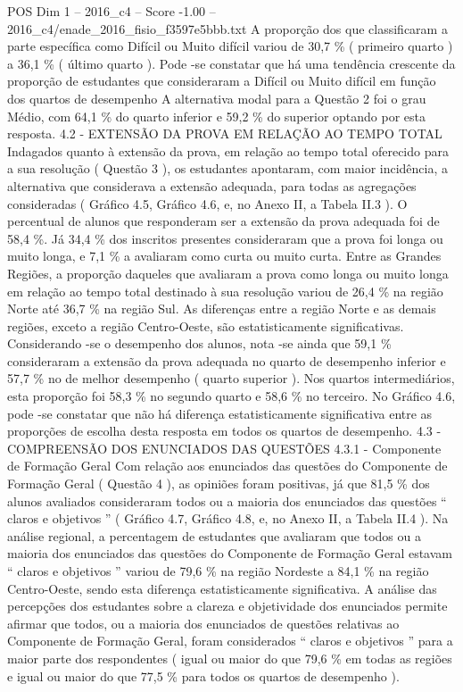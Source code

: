 \begin{textsample}{POS Dim 1 – 2016\_c4 – Score -1.00 – 2016\_c4/enade\_2016\_fisio\_f3597e5bbb.txt}
A proporção dos que classificaram a parte específica como Difícil ou Muito difícil variou de 30,7 \% ( primeiro quarto ) a 36,1 \% ( último quarto ).
Pode -se constatar que há uma tendência crescente da proporção de estudantes que consideraram a Difícil ou Muito difícil em função dos quartos de desempenho A alternativa modal para a Questão 2 foi o grau Médio, com 64,1 \% do quarto inferior e 59,2 \% do superior optando por esta resposta. 4.2 - EXTENSÃO DA PROVA EM RELAÇÃO AO TEMPO TOTAL Indagados quanto à extensão da prova, em relação ao tempo total oferecido para a sua resolução ( Questão 3 ), os estudantes apontaram, com maior incidência, a alternativa que considerava a extensão adequada, para todas as agregações consideradas ( Gráfico 4.5, Gráfico 4.6, e, no Anexo II, a Tabela II.3 ).
O percentual de alunos que responderam ser a extensão da prova adequada foi de 58,4 \%.
Já 34,4 \% dos inscritos presentes consideraram que a prova foi longa ou muito longa, e 7,1 \% a avaliaram como curta ou muito curta.
Entre as Grandes Regiões, a proporção daqueles que avaliaram a prova como longa ou muito longa em relação ao tempo total destinado à sua resolução variou de 26,4 \% na região Norte até 36,7 \% na região Sul.
As diferenças entre a região Norte e as demais regiões, exceto a região Centro-Oeste, são estatisticamente significativas.
Considerando -se o desempenho dos alunos, nota -se ainda que 59,1 \% consideraram a extensão da prova adequada no quarto de desempenho inferior e 57,7 \% no de melhor desempenho ( quarto superior ).
Nos quartos intermediários, esta proporção foi 58,3 \% no segundo quarto e 58,6 \% no terceiro.
No Gráfico 4.6, pode -se constatar que não há diferença estatisticamente significativa entre as proporções de escolha desta resposta em todos os quartos de desempenho. 4.3 - COMPREENSÃO DOS ENUNCIADOS DAS QUESTÕES 4.3.1 - Componente de Formação Geral Com relação aos enunciados das questões do Componente de Formação Geral ( Questão 4 ), as opiniões foram positivas, já que 81,5 \% dos alunos avaliados consideraram todos ou a maioria dos enunciados das questões “ claros e objetivos ” ( Gráfico 4.7, Gráfico 4.8, e, no Anexo II, a Tabela II.4 ).
Na análise regional, a percentagem de estudantes que avaliaram que todos ou a maioria dos enunciados das questões do Componente de Formação Geral estavam “ claros e objetivos ” variou de 79,6 \% na região Nordeste a 84,1 \% na região Centro-Oeste, sendo esta diferença estatisticamente significativa.
A análise das percepções dos estudantes sobre a clareza e objetividade dos enunciados permite afirmar que todos, ou a maioria dos enunciados de questões relativas ao Componente de Formação Geral, foram considerados “ claros e objetivos ” para a maior parte dos respondentes ( igual ou maior do que 79,6 \% em todas as regiões e igual ou maior do que 77,5 \% para todos os quartos de desempenho ).

\end{textsample}
